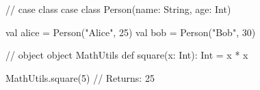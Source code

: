 // case class
case class Person(name: String, age: Int)

val alice = Person("Alice", 25)
val bob = Person("Bob", 30)

// object
object MathUtils {
  def square(x: Int): Int = x * x
}

MathUtils.square(5) // Returns: 25